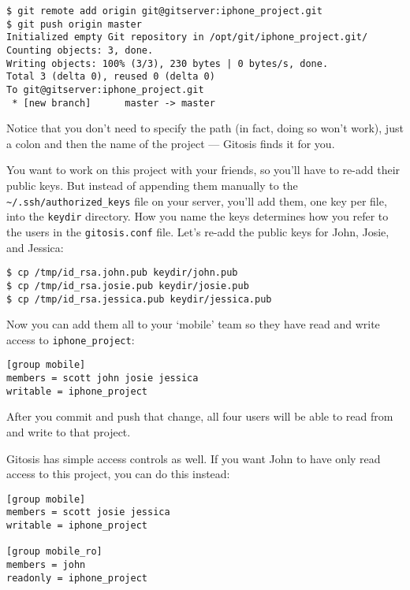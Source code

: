 \documentclass[a4paper]{book}
\newcounter{tab}[chapter]
\begin{document}
\begin{shaded}\begin{verbatim}
$ git remote add origin git@gitserver:iphone_project.git
$ git push origin master
Initialized empty Git repository in /opt/git/iphone_project.git/
Counting objects: 3, done.
Writing objects: 100% (3/3), 230 bytes | 0 bytes/s, done.
Total 3 (delta 0), reused 0 (delta 0)
To git@gitserver:iphone_project.git
 * [new branch]      master -> master
\end{verbatim}\end{shaded}

Notice that you don't need to specify the path (in fact, doing so won't work), just a colon and then the name of the project --- Gitosis finds it for you.

You want to work on this project with your friends, so you'll have to re-add their public keys. But instead of appending them manually to the \texttt{\textasciitilde{}/.ssh/authorized\_keys} file on your server, you'll add them, one key per file, into the \texttt{keydir} directory. How you name the keys determines how you refer to the users in the \texttt{gitosis.conf} file. Let's re-add the public keys for John, Josie, and Jessica:

\begin{shaded}\begin{verbatim}
$ cp /tmp/id_rsa.john.pub keydir/john.pub
$ cp /tmp/id_rsa.josie.pub keydir/josie.pub
$ cp /tmp/id_rsa.jessica.pub keydir/jessica.pub
\end{verbatim}\end{shaded}

Now you can add them all to your `mobile' team so they have read and write access to \texttt{iphone\_project}:

\begin{shaded}\begin{verbatim}
[group mobile]
members = scott john josie jessica
writable = iphone_project
\end{verbatim}\end{shaded}

After you commit and push that change, all four users will be able to read from and write to that project.

Gitosis has simple access controls as well. If you want John to have only read access to this project, you can do this instead:

\begin{shaded}\begin{verbatim}
[group mobile]
members = scott josie jessica
writable = iphone_project

[group mobile_ro]
members = john
readonly = iphone_project
\end{verbatim}\end{shaded}
\end{document}
